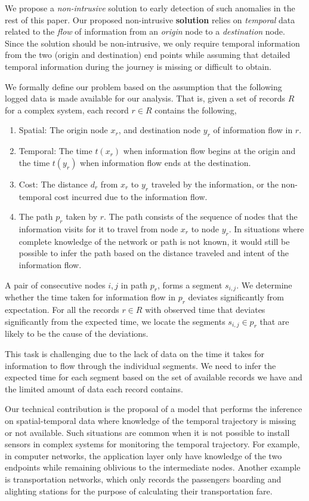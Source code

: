 \documentclass{sig-alternate}
\begin{document}
We propose a \emph{non-intrusive} solution to early detection of such anomalies in the rest of this paper. Our proposed non-intrusive \textbf{solution} relies on \emph{temporal} data related to the \emph{flow} of information from an \emph{origin} node to a \emph{destination} node. Since the solution should be non-intrusive, we only require temporal information from the two (origin and destination) end points while assuming that detailed temporal information during the journey is missing or difficult to obtain.

We formally define our problem based on the assumption that the following logged data is made available for our analysis. That is, given a set of records $R$ for a complex system, each record $r \in R$ contains the following,
\begin{enumerate}
	\item Spatial: The origin node $x_r$, and destination node $y_r$ of information flow in $r$.
	\item Temporal: The time $t(x_r)$ when information flow begins at the origin and the time $t(y_r)$ when information flow ends at the destination.
	\item Cost: The distance $d_r$ from $x_r$ to $y_r$ traveled by the information, or the non-temporal cost incurred due to the information flow.
	\item The path $p_r$ taken by $r$. The path consists of the sequence of nodes that the information visits for it to travel from node $x_r$ to node $y_r$. In situations where complete knowledge of the network or path is not known, it would still be possible to infer the path based on the distance traveled and intent of the information flow.
\end{enumerate}
A pair of consecutive nodes $i,j$ in path $p_r$, forms a segment $s_{i,j}$. We determine whether the time taken for information flow in $p_r$ deviates significantly from expectation. For all the records $r \in R$ with observed time that deviates significantly from the expected time, we locate the segments $s_{i,j} \in p_r$ that are likely to be the cause of the deviations.

This task is challenging due to the lack of data on the time it takes for information to flow through the individual segments. We need to infer the expected time for each segment based on the set of available records we have and the limited amount of data each record contains.

Our technical contribution is the proposal of a model that performs the inference on spatial-temporal data where knowledge of the temporal trajectory is missing or not available. Such situations are common when it is not possible to install sensors in complex systems for monitoring the temporal trajectory. For example, in computer networks, the application layer only have knowledge of the two endpoints while remaining oblivious to the intermediate nodes. Another example is transportation networks, which only records the passengers boarding and alighting stations for the purpose of calculating their transportation fare.
\end{document}
